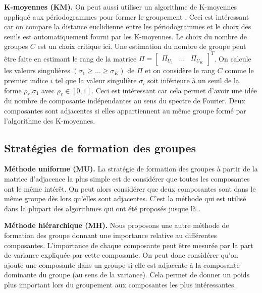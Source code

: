 \documentclass{gretsi}
\newcommand{\val}[3]{(#1_1 #3 \dots #3 #1_#2)}
\newcommand{\inter}{\left[0, 1\right]}
\begin{document}
\noindent\textbf{K-moyennes (KM).}\label{par:KM} 
    On peut aussi utiliser un algorithme de K-moyennes appliqué aux périodogrammes pour former le groupement \cite{alvarez_13_auto}.
    Ceci est intéressant car on compare la distance euclidienne entre les périodogrammes et le choix des seuils est automatiquement fourni par les K-moyennes.
    Le choix du nombre de groupes $C$ est un choix critique ici.
    Une estimation du nombre de groupe peut être faite en estimant le rang de la matrice $\Pi = \begin{bmatrix}\Pi_{U_1}&\dots&\Pi_{U_K}\end{bmatrix}^T$.
    On calcule les valeurs singulières $\val{\sigma}{K}{\ge}$ de $\Pi$ et on considère le rang $C$ comme le premier indice $i$ tel que la valeur singulière $\sigma_i$  soit inférieure à un seuil de la forme $\rho_r.\sigma_1$ avec $\rho_r \in \inter$.
    Ceci est intéressant car cela permet d'avoir une idée du nombre de composante indépendantes au sens du spectre de Fourier.
    Deux composantes sont adjacentes si elles appartiennent au même groupe formé par l'algorithme des K-moyennes.

\vspace{-.2cm}
\subsection{Stratégies de formation des groupes}
\label{sub:clust}
\vspace{-.1cm}
\begin{sloppypar}
\noindent\textbf{Méthode uniforme (MU).}
    La stratégie de formation des groupes à partir de la matrice d'adjacence la plus simple est de considérer que toutes les composantes ont le même intérêt.
    On peut alors considérer que deux composantes sont dans le même groupe dès lors qu'elles sont adjacentes.
    C'est la méthode qui est utilisé dans la plupart des algorithmes qui ont été proposés jusque là \cite{abalov_14_auto, alvarez_13_auto}.
\end{sloppypar}


\begin{sloppypar}
\noindent\textbf{Méthode hiérarchique (MH).}
    Nous proposons une autre méthode de formation des groupe donnant une importance relative au différentes composantes.
    L'importance de chaque composante peut être mesurée par la part de variance expliquée par cette composante.
    On peut donc considérer qu'on ajoute une composante dans un groupe si elle est adjacente à la composante dominante du groupe (au sens de la variance).
    Cela permet de donner un poids plus important lors du groupement aux composantes les plus intéressantes.
\end{sloppypar}
\vspace{-.3cm}
\end{document}
